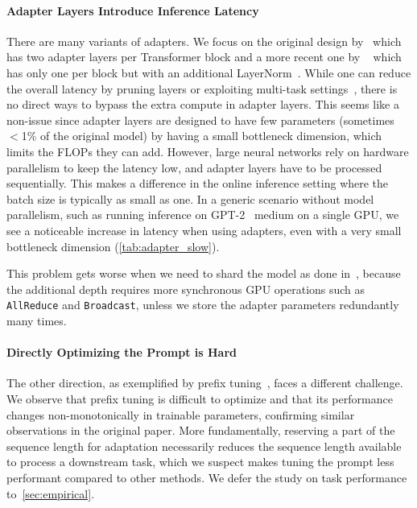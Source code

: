 \paragraph{Adapter Layers Introduce Inference Latency} There are many variants of adapters. We focus on the original design by~\citet{houlsby_parameter-efficient_2019} which has two adapter layers per Transformer block and a more recent one by ~\citet{lin-etal-2020-exploring} which has only one per block but with an additional LayerNorm~\citep{ba2016layer}. While one can reduce the overall latency by pruning layers or exploiting multi-task settings~\citep{ruckle2020adapterdrop,pfeiffer2021adapterfusion}, there is no direct ways to bypass the extra compute in adapter layers. This seems like a non-issue since adapter layers are designed to have few parameters (sometimes $<$1\% of the original model) by having a small bottleneck dimension, which limits the FLOPs they can add. However, large neural networks rely on hardware parallelism to keep the latency low, and adapter layers have to be processed sequentially. This makes a difference in the online inference setting where the batch size is typically as small as one. In a generic scenario without model parallelism, such as running inference on GPT-2~\citep{radford_language_nodate} medium on a single GPU, we see a noticeable increase in latency when using adapters, even with a very small bottleneck dimension (\autoref{tab:adapter_slow}).

This problem gets worse when we need to shard the model as done in~\citet{shoeybi2020megatronlm, lepikhin2020gshard}, because the additional depth requires more synchronous GPU operations such as \texttt{AllReduce} and \texttt{Broadcast}, unless we store the adapter parameters redundantly many times.

\paragraph{Directly Optimizing the Prompt is Hard} The other direction, as exemplified by prefix tuning~\citep{li_prefix-tuning_2021}, faces a different challenge. We observe that prefix tuning is difficult to optimize and that its performance changes non-monotonically in trainable parameters, confirming similar observations in the original paper. More fundamentally, reserving a part of the sequence length for adaptation necessarily reduces the sequence length available to process a downstream task, which we suspect makes tuning the prompt less performant compared to other methods. We defer the study on task performance to~\autoref{sec:empirical}.

